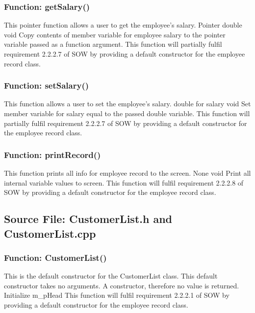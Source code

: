 \documentclass[12pt]{article}%
\newcounter{subsubsubsection}[subsubsection]
\begin{document}
\subsubsection{Function:  getSalary()}
This pointer function allows a user to get the employee's salary.
Pointer double
void
Copy contents of member variable for employee salary to the pointer variable passed as a function argument.
This function will partially fulfil requirement 2.2.2.7 of SOW by providing a default constructor for the
employee record class.

\subsubsection{Function:  setSalary()}
This function allows a user to set the employee's salary.
double for salary
void
Set member variable for salary equal to the passed double variable.
This function will partially fulfil requirement 2.2.2.7 of SOW by providing a default constructor for the
employee record class.

\subsubsection{Function:  printRecord()}
This function prints all info for employee record to the screen.
None
void
Print all internal variable values to screen.
This function will fulfil requirement 2.2.2.8 of SOW by providing a default constructor for the
employee record class.

\subsection{Source File: CustomerList.h and CustomerList.cpp}
\subsubsection{Function: CustomerList()}
This is the default constructor for the CustomerList class.
This default constructor takes no arguments.
A constructor, therefore no value is returned.
Initialize m_pHead
This function will fulfil requirement 2.2.2.1 of SOW by providing a default constructor for the
employee record class.
\end{document}
